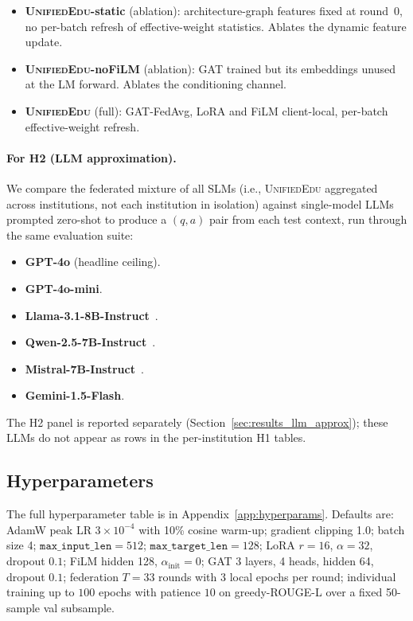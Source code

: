 \documentclass[11pt]{article}
\theoremstyle{plain}
\theoremstyle{definition}
\theoremstyle{remark}
\newcommand{\UniEdu}{\textsc{UnifiedEdu}}
\begin{document}
\begin{itemize}[leftmargin=1.5em, itemsep=2pt]
\smallskip
Implementation details for all four
distillation-based baselines (mentor/mentee setup,
distillation losses, hyperparameters,
public-dataset usage) are in
Appendix~\ref{app:baseline_implementations}.
  \item \textbf{\UniEdu{}-static} (ablation):
  architecture-graph features fixed at round~0, no
  per-batch refresh of effective-weight statistics.
  Ablates the dynamic feature update.
  \item \textbf{\UniEdu{}-noFiLM} (ablation):
  GAT trained but its embeddings unused at the LM
  forward. Ablates the conditioning channel.
  \item \textbf{\UniEdu{}} (full): GAT-FedAvg, LoRA
  and FiLM client-local, per-batch effective-weight
  refresh.
\end{itemize}

\paragraph{For H2 (LLM approximation).}
We compare the federated mixture of all SLMs (i.e.,
\UniEdu{} aggregated across institutions, not each
institution in isolation) against single-model LLMs
prompted zero-shot to produce a
$(q, a)$ pair from each test context, run through
the same evaluation suite:
\begin{itemize}[leftmargin=1.5em, itemsep=2pt]
  \item \textbf{GPT-4o} (headline ceiling).
  \item \textbf{GPT-4o-mini}.
  \item \textbf{Llama-3.1-8B-Instruct}~\citep{grattafiori2024llama3}.
  \item \textbf{Qwen-2.5-7B-Instruct}~\citep{bai2023qwen}.
  \item \textbf{Mistral-7B-Instruct}~\citep{jiang2023mistral}.
  \item \textbf{Gemini-1.5-Flash}.
\end{itemize}
The H2 panel is reported separately
(Section~\ref{sec:results_llm_approx}); these LLMs
do not appear as rows in the per-institution H1
tables.

\subsection{Hyperparameters}
\label{sec:hyperparams}

The full hyperparameter table is in
Appendix~\ref{app:hyperparams}. Defaults are: AdamW
peak LR $3{\times}10^{-4}$ with 10\% cosine warm-up;
gradient clipping 1.0; batch size 4;
$\texttt{max\_input\_len}{=}512$;
$\texttt{max\_target\_len}{=}128$; LoRA $r{=}16$,
$\alpha{=}32$, dropout $0.1$; FiLM hidden 128,
$\alpha_{\text{init}}{=}0$; GAT 3 layers, 4 heads,
hidden 64, dropout $0.1$; federation $T{=}33$ rounds
with 3 local epochs per round; individual training
up to $100$ epochs with patience $10$ on greedy-ROUGE-L
over a fixed 50-sample val subsample.
\end{document}
